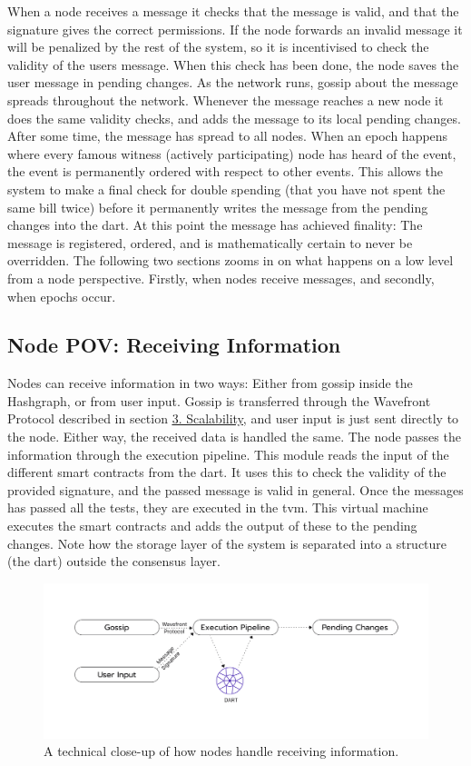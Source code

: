     When a node receives a message it checks that the message is valid, and that the signature gives the correct permissions. If the node forwards an invalid message it will be penalized by the rest of the system, so it is incentivised to check the validity of the users message. When this check has been done, the node saves the user message in pending changes. As the network runs, gossip about the message spreads throughout the network. Whenever the message reaches a new node it does the same validity checks, and adds the message to its local pending changes.
    After some time, the message has spread to all nodes. When an epoch happens where every famous witness (actively participating) node has heard of the event, the event is permanently ordered with respect to other events. This allows the system to make a final check for double spending (that you have not spent the same bill twice) before it permanently writes the message from the pending changes into the \gls{dart}. At this point the message has achieved finality: The message is registered, ordered, and is mathematically certain to never be overridden. The following two sections zooms in on what happens on a low level from a node perspective. Firstly, when nodes receive messages, and secondly, when epochs occur.

\subsection{Node POV: Receiving Information}
    Nodes can receive information in two ways: Either from gossip inside the Hashgraph, or from user input. Gossip is transferred through the Wavefront Protocol described in section \hyperref[sec:scalability]{\underline{3. Scalability}}, and user input is just sent directly to the node. Either way, the received data is handled the same. The node passes the information through the execution pipeline. This module reads the input of the different smart contracts from the \gls{dart}. It uses this to check the validity of the provided signature, and the passed message is valid in general. Once the messages has passed all the tests, they are executed in the \gls{tvm}. This virtual machine executes the smart contracts and adds the output of these to the pending changes. Note how the storage layer of the system is separated into a structure (the \gls{dart}) outside the consensus layer.

    \begin{figure}[H]
        \centering
        \includegraphics[width=1.2\textwidth,center]{figures/signature_zoom.png}
        \caption{A technical close-up of how nodes handle receiving information.}
        \label{figure:signature_zoom}
    \end{figure}

